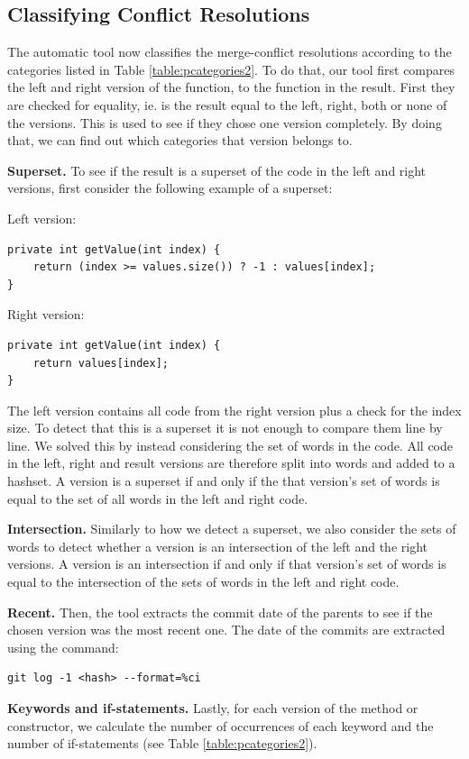 \subsection{Classifying Conflict Resolutions}
The automatic tool now classifies the merge-conflict resolutions according to the categories listed in Table \ref{table:pcategories2}. To do that, our tool first compares the left and right version of the function, to the function in the result. First they are checked for equality, ie. is the result equal to the left, right, both or none of the versions. This is used to see if they chose one version completely. By doing that, we can find out which categories that version belongs to.

\textbf{Superset.} To see if the result is a superset of the code in the left and right versions, first consider the following example of a superset:

Left version:
\lstset{language=Java,numbers=left,xleftmargin=2em,frame=single,framexleftmargin=1.5em}
\begin{lstlisting}[frame=single,breaklines=true,tabsize=2]
private int getValue(int index) {
	return (index >= values.size()) ? -1 : values[index];
}
\end{lstlisting}

Right version:
\lstset{language=Java,numbers=left,xleftmargin=2em,frame=single,framexleftmargin=1.5em}
\begin{lstlisting}[frame=single,breaklines=true,tabsize=2]
private int getValue(int index) {
	return values[index];
}
\end{lstlisting}
The left version contains all code from the right version plus a check for the index size. To detect that this is a superset it is not enough to compare them line by line. We solved this by instead considering the set of words in the code. All code in the left, right and result versions are therefore split into words and added to a hashset. A version is a superset if and only if the  that version’s set of words is equal to the set of all words in the left and right code.

\textbf{Intersection.} Similarly to how we detect a superset, we also consider the sets of words to detect whether a version is an intersection of the left and the right versions. A version is an intersection if and only if that version’s set of words is equal to the intersection of the sets of words in the left and right code.

\textbf{Recent.} Then, the tool extracts the commit date of the parents to see if the chosen version was the most recent one. The date of the commits are extracted using the command:
\lstset{language=Bash,numbers=left,xleftmargin=2em,frame=single,framexleftmargin=1.5em}
\begin{lstlisting}[frame=single,breaklines=true,tabsize=2]
git log -1 <hash> --format=%ci
\end{lstlisting}

\textbf{Keywords and if-statements.} Lastly, for each version of the method or constructor, we calculate the number of occurrences of each keyword and the number of if-statements (see Table \ref{table:pcategories2}).





